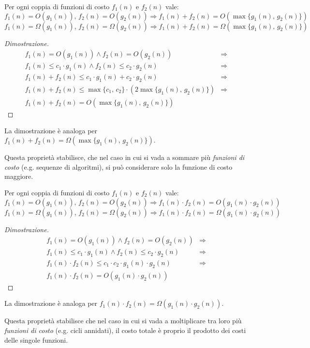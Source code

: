 \begin{definition}
    Per ogni coppia di funzioni di costo $f_1(n)$ e $f_2(n)$ vale:
    \[f_1(n)=O(g_1(n)),\,f_2(n)=O(g_2(n))\Rightarrow f_1(n)+f_2(n)=
    O(\max\{g_1(n),\,g_2(n)\})\]
    \[f_1(n)=\Omega(g_1(n)),\,f_2(n)=\Omega(g_2(n))\Rightarrow f_1(n)+f_2(n)=
    \Omega(\max\{g_1(n),\,g_2(n)\})\]
\end{definition}
\begin{proof}[Dimostrazione]
    \[\begin{array}{rc}
        f_1(n)=O(g_1(n))\wedge f_2(n)=O(g_2(n)) & \Rightarrow\\
        f_1(n)\leq c_1\cdot g_1(n)\wedge f_2(n)\leq c_2\cdot g_2(n) & \Rightarrow\\
        f_1(n)+f_2(n)\leq c_1\cdot g_1(n)+c_2\cdot g_2(n) & \Rightarrow\\
        f_1(n)+f_2(n)\leq\max\{c_1,\,c_2\}\cdot(2\max\{g_1(n),\,g_2(n)\}) & \Rightarrow\\
        f_1(n)+f_2(n)=O(\max\{g_1(n),\,g_2(n)\})
    \end{array}\]
\end{proof}
\begin{note}
    La dimostrazione è analoga per $f_1(n)+f_2(n)=\Omega(\max\{g_1(n),\,g_2(n)\})$.
\end{note}\noindent
Questa proprietà stabilisce, che nel caso in cui si vada a sommare più \emph{funzioni
di costo} (e.g. sequenze di algoritmi), si può considerare solo la funzione di
costo maggiore.

\begin{definition}
    Per ogni coppia di funzioni di costo $f_1(n)$ e $f_2(n)$ vale:
    \[f_1(n)=O(g_1(n)),\,f_2(n)=O(g_2(n))\Rightarrow f_1(n)\cdot f_2(n)=
    O(g_1(n)\cdot g_2(n))\]
    \[f_1(n)=\Omega(g_1(n)),\,f_2(n)=\Omega(g_2(n))\Rightarrow f_1(n)\cdot f_2(n)=
    \Omega(g_1(n)\cdot g_2(n))\]
\end{definition}
\begin{proof}[Dimostrazione]
    \[\begin{array}{rc}
        f_1(n)=O(g_1(n))\wedge f_2(n)=O(g_2(n)) & \Rightarrow\\
        f_1(n)\leq c_1\cdot g_1(n)\wedge f_2(n)\leq c_2\cdot g_2(n) & \Rightarrow\\
        f_1(n)\cdot f_2(n)\leq c_1\cdot c_2\cdot g_1(n)\cdot g_2(n) & \Rightarrow\\
        f_1(n)\cdot f_2(n)=O(g_1(n)\cdot g_2(n))
    \end{array}\]
\end{proof}
\begin{note}
    La dimostrazione è analoga per $f_1(n)\cdot f_2(n)=\Omega(g_1(n)\cdot g_2(n))$.
\end{note}\noindent
Questa proprietà stabilisce che nel caso in cui si vada a moltiplicare tra loro più
\emph{funzioni di costo} (e.g. cicli annidati), il costo totale è proprio il
prodotto dei costi delle singole funzioni.

